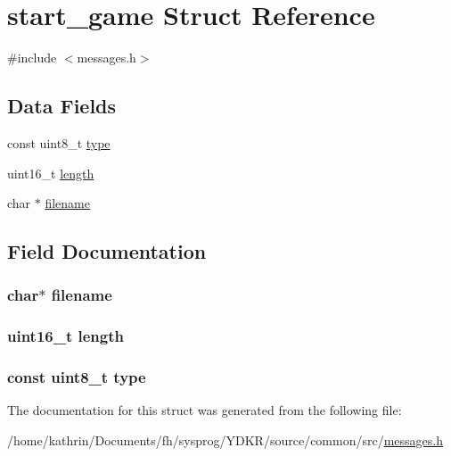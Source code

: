 \hypertarget{structstart__game}{
\section{start\_\-game Struct Reference}
\label{structstart__game}
}


{\ttfamily \#include $<$messages.h$>$}

\subsection*{Data Fields}
\begin{DoxyCompactItemize}
\item 
const uint8\_\-t \hyperlink{structstart__game_aca7dafb0092715a03dd40f45fc607f2a}{type}
\item 
uint16\_\-t \hyperlink{structstart__game_a1892eba2086d12ac2b09005aeb09ea3b}{length}
\item 
char $\ast$ \hyperlink{structstart__game_aeac90097f29f7529968697163cea5c18}{filename}
\end{DoxyCompactItemize}


\subsection{Field Documentation}
\hypertarget{structstart__game_aeac90097f29f7529968697163cea5c18}{
\subsubsection[{filename}]{\setlength{\rightskip}{0pt plus 5cm}char$\ast$ {\bf filename}}}
\label{structstart__game_aeac90097f29f7529968697163cea5c18}
\hypertarget{structstart__game_a1892eba2086d12ac2b09005aeb09ea3b}{
\subsubsection[{length}]{\setlength{\rightskip}{0pt plus 5cm}uint16\_\-t {\bf length}}}
\label{structstart__game_a1892eba2086d12ac2b09005aeb09ea3b}
\hypertarget{structstart__game_aca7dafb0092715a03dd40f45fc607f2a}{
\subsubsection[{type}]{\setlength{\rightskip}{0pt plus 5cm}const uint8\_\-t {\bf type}}}
\label{structstart__game_aca7dafb0092715a03dd40f45fc607f2a}


The documentation for this struct was generated from the following file:\begin{DoxyCompactItemize}
\item 
/home/kathrin/Documents/fh/sysprog/YDKR/source/common/src/\hyperlink{messages_8h}{messages.h}\end{DoxyCompactItemize}
